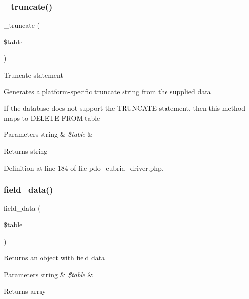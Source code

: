 \subsubsection{\texorpdfstring{\_truncate()}{\_truncate()}}
{\footnotesize\ttfamily \+\_\+truncate (\begin{DoxyParamCaption}\item[{}]{\$table }\end{DoxyParamCaption})\hspace{0.3cm}{\ttfamily [protected]}}

Truncate statement

Generates a platform-\/specific truncate string from the supplied data

If the database does not support the T\+R\+U\+N\+C\+A\+TE statement, then this method maps to \textquotesingle{}D\+E\+L\+E\+TE F\+R\+OM table\textquotesingle{}


\begin{DoxyParams}[1]{Parameters}
string & {\em \$table} & \\
\hline
\end{DoxyParams}
\begin{DoxyReturn}{Returns}
string 
\end{DoxyReturn}


Definition at line 184 of file pdo\+\_\+cubrid\+\_\+driver.\+php.

\mbox{\label{class_c_i___d_b__pdo__cubrid__driver_a90355121e1ed009e0efdbd544ab56efa}} 
\subsubsection{\texorpdfstring{field\_data()}{field\_data()}}
{\footnotesize\ttfamily field\+\_\+data (\begin{DoxyParamCaption}\item[{}]{\$table }\end{DoxyParamCaption})}

Returns an object with field data


\begin{DoxyParams}[1]{Parameters}
string & {\em \$table} & \\
\hline
\end{DoxyParams}
\begin{DoxyReturn}{Returns}
array 
\end{DoxyReturn}


